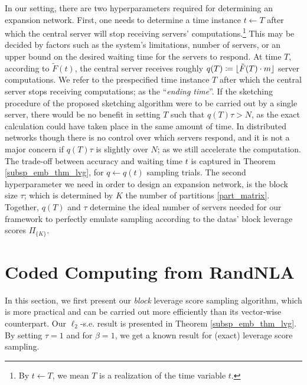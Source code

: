 \documentclass[journal,letterpaper,onecolumn,twoside,nofonttune]{IEEEtran}
\newcommand{\Ft}{\tilde{F}}
\DeclarePairedDelimiter\floor{\lfloor}{\rfloor}
\begin{document}
In our setting, there are two hyperparameters required for determining an expansion network. First, one needs to determine a time instance $t\gets T$ after which the central server will stop receiving servers' computations.\footnote{By $t\gets T$, we mean $T$ is a realization of the time variable $t$.} This may be decided by factors such as the system's limitations, number of servers, or an upper bound on the desired waiting time for the servers to respond. At time $T$, according to $\Ft(t)$, the central server receives roughly $q(T)\coloneqq\floor{\Ft(T)\cdot m}$ server computations. We refer to the prespecified time instance $T$ after which the central server stops receiving computations; as the ``\textit{ending time}''. If the sketching procedure of the proposed sketching algorithm were to be carried out by a single server, there would be no benefit in setting $T$ such that $q(T)\tau>N$, as the exact calculation could have taken place in the same amount of time. In distributed networks though there is no control over which servers respond, and it is not a major concern if $q(T)\tau$ is slightly over $N$; as we still accelerate the computation. The trade-off between accuracy and waiting time $t$ is captured in Theorem \ref{subsp_emb_thm_lvg}, for $q\gets q(t)$ sampling trials. The second hyperparameter we need in order to design an expansion network, is the block size $\tau$; which is determined by $K$ the number of partitions \eqref{part_matrix}. Together, $q(T)$ and $\tau$ determine the ideal number of servers needed for our framework to perfectly emulate sampling according to the datas' block leverage scores $\Pi_{\{K\}}$.

\section{Coded Computing from RandNLA}
\label{cc_fr_rnla_sec}

In this section, we first present our \textit{block} leverage score sampling algorithm, which is more practical and can be carried out more efficiently than its vector-wise counterpart. Our $\ell_2$-s.e. result is presented in Theorem \ref{subsp_emb_thm_lvg}. By setting $\tau=1$ and for $\beta=1$, we get a known result for (exact) leverage score sampling.
\end{document}
